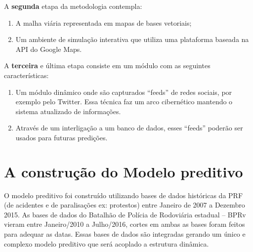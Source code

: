 A \textbf{segunda} etapa da metodologia contempla:
 \begin{enumerate}
    \item A malha viária representada em mapas de bases vetoriais;
    \item Um ambiente de simulação interativa que utiliza uma plataforma baseada na API do Google Maps.
  \end{enumerate}

A \textbf{terceira} e última etapa consiste em um módulo com as seguintes características:
  \begin{enumerate}
     \item Um módulo dinâmico onde são capturados ``feeds'' de redes sociais, por exemplo pelo Twitter. 
	Essa técnica faz um arco cibernético mantendo o sistema atualizado de informações.
     \item Através de um interligação a um banco de dados, esses ``feeds'' poderão ser usados para futuras predições.
  \end{enumerate}


\pagebreak


\section{A construção do Modelo preditivo}

O modelo preditivo foi construído utilizando bases de dados históricas da PRF (de acidentes e de paralisações ex: protestos) entre Janeiro de 2007 a 
Dezembro 2015. As bases de dados do Batalhão de Polícia de Rodoviária estadual -- BPRv vieram entre Janeiro/2010 a Julho/2016, cortes em ambas as bases foram 
feitos para adequar as datas. Essas bases de dados são integradas gerando um único e complexo modelo preditivo que será acoplado a estrutura dinâmica.


